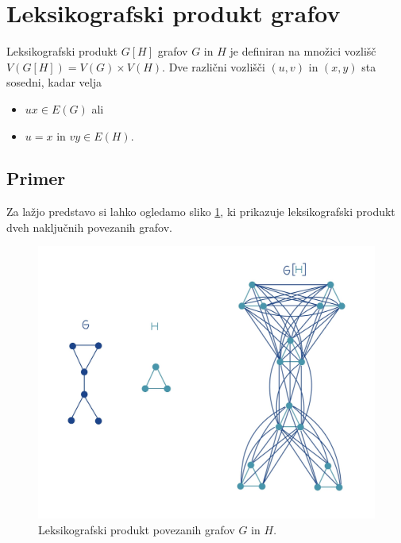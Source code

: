 \documentclass[mat1, tisk]{fmfdelo}
\newcommand{\1}{(1, 1, \ldots, 1)}
\newcommand{\2}{(2, 2, \ldots, 2)}
\begin{document}
\section{Leksikografski produkt grafov}\label{s:leks_prod}


\begin{definicija} \label{def:leks_prod}
    Leksikografski produkt $G[H]$ grafov $G$ in $H$ je definiran na množici vozlišč 
    $V (G[H]) = V (G)\times V (H)$. Dve različni vozlišči $(u, v)$ in $(x, y)$ sta 
    sosedni, kadar velja
\begin{itemize}
    \item $ux \in E(G)$ ali
    \item $u = x$ in $vy \in E(H).$ 
\end{itemize}
\end{definicija}




\subsection{Primer} 
Za lažjo predstavo si lahko ogledamo sliko \ref{fig:produkt}, ki prikazuje leksikografski 
produkt dveh naključnih povezanih grafov.

\begin{figure}[h]
    \centering
    \includegraphics[width=\textwidth]{IMG_produkt.jpg}   
    \caption{Leksikografski produkt povezanih grafov $G$ in $H$.}   
    \label{fig:produkt}
\end{figure}
\end{document}
